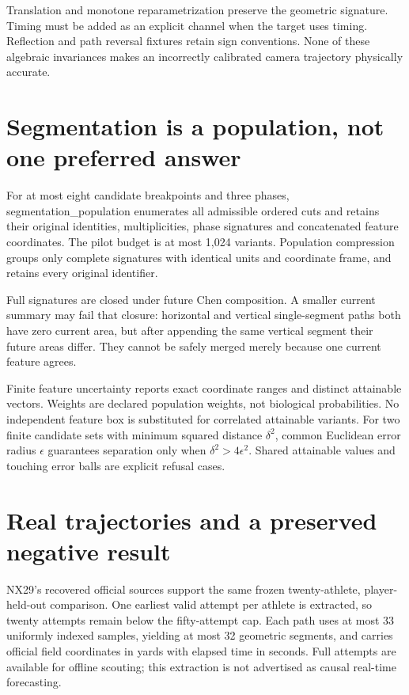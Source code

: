 \documentclass[
  11pt,
  a4paper,
]{report}
\begin{document}
Translation and monotone reparametrization preserve the geometric
signature. Timing must be added as an explicit channel when the target
uses timing. Reflection and path reversal fixtures retain sign
conventions. None of these algebraic invariances makes an incorrectly
calibrated camera trajectory physically accurate.

\hypertarget{segmentation-is-a-population-not-one-preferred-answer}{%
\section{Segmentation is a population, not one preferred
answer}\label{segmentation-is-a-population-not-one-preferred-answer}}

For at most eight candidate breakpoints and three phases,
segmentation\_population enumerates all admissible ordered cuts and
retains their original identities, multiplicities, phase signatures and
concatenated feature coordinates. The pilot budget is at most 1,024
variants. Population compression groups only complete signatures with
identical units and coordinate frame, and retains every original
identifier.

Full signatures are closed under future Chen composition. A smaller
current summary may fail that closure: horizontal and vertical
single-segment paths both have zero current area, but after appending
the same vertical segment their future areas differ. They cannot be
safely merged merely because one current feature agrees.

Finite feature uncertainty reports exact coordinate ranges and distinct
attainable vectors. Weights are declared population weights, not
biological probabilities. No independent feature box is substituted for
correlated attainable variants. For two finite candidate sets with
minimum squared distance \(\delta^2\), common Euclidean error radius
\(\epsilon\) guarantees separation only when \(\delta^2>4\epsilon^2\).
Shared attainable values and touching error balls are explicit refusal
cases.

\hypertarget{real-trajectories-and-a-preserved-negative-result}{%
\section{Real trajectories and a preserved negative
result}\label{real-trajectories-and-a-preserved-negative-result}}

NX29's recovered official sources support the same frozen
twenty-athlete, player-held-out comparison. One earliest valid attempt
per athlete is extracted, so twenty attempts remain below the
fifty-attempt cap. Each path uses at most 33 uniformly indexed samples,
yielding at most 32 geometric segments, and carries official field
coordinates in yards with elapsed time in seconds. Full attempts are
available for offline scouting; this extraction is not advertised as
causal real-time forecasting.
\end{document}
